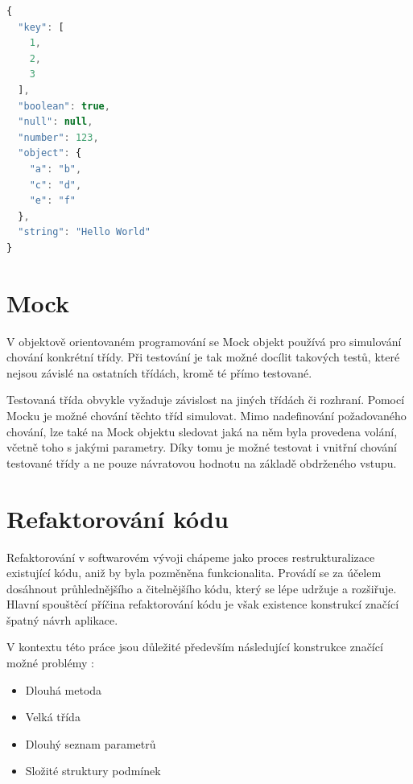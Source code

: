 \documentclass[thesis=B,czech]{FITthesis}[2012/06/26]
\begin{document}
\begin{lstlisting}[language=JavaScript, caption={Ukázka formátu JSON}]
{
  "key": [
    1,
    2,
    3
  ],
  "boolean": true,
  "null": null,
  "number": 123,
  "object": {
    "a": "b",
    "c": "d",
    "e": "f"
  },
  "string": "Hello World"
}
\end{lstlisting}

\section{Mock}
V objektově orientovaném programování se Mock objekt používá pro simulování chování konkrétní třídy.\cite{mock}
Při testování je tak možné docílit takových testů, které nejsou závislé na ostatních třídách, kromě té přímo testované.
\par
Testovaná třída obvykle vyžaduje závislost na jiných třídách či rozhraní. Pomocí Mocku je možné chování těchto tříd simulovat.
Mimo nadefinování požadovaného chování, lze také na Mock objektu sledovat jaká na něm byla provedena volání, včetně toho
s jakými parametry. Díky tomu je možné testovat i vnitřní chování testované třídy a ne pouze návratovou hodnotu na základě 
obdrženého vstupu.\cite{mock}

\section{Refaktorování kódu}
Refaktorování v softwarovém vývoji chápeme jako proces restrukturalizace existující kódu, aniž by byla 
pozměněna funkcionalita. Provádí se za účelem dosáhnout průhlednějšího a čitelnějšího kódu, který
se lépe udržuje a rozšiřuje. \cite{refaktoring} Hlavní spouštěcí příčina refaktorování kódu je však existence 
konstrukcí značící špatný návrh aplikace. 

V kontextu této práce jsou důležité především následující konstrukce značící možné problémy \cite{refaktoring}:  
\begin{itemize}
\item Dlouhá metoda
\item Velká třída
\item Dlouhý seznam parametrů
\item Složité struktury podmínek
\end{itemize}
\end{document}
